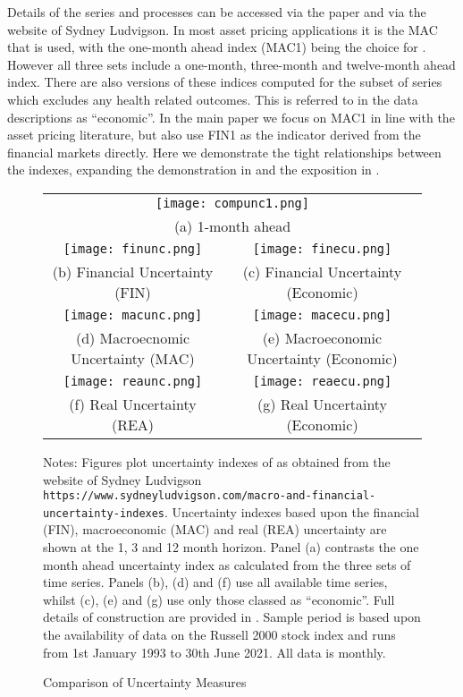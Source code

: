 \documentclass{article}
\begin{document}
Details of the series and processes can be accessed via the paper and via the website of Sydney Ludvigson. In most asset pricing applications it is the MAC that is used, with the one-month ahead index (MAC1) being the choice for \cite{bali2017economic,bali2021macroeconomic}. However all three sets include a one-month, three-month and twelve-month ahead index. There are also versions of these indices computed for the subset of series which excludes any health related outcomes. This is referred to in the data descriptions as ``economic''. In the main paper we focus on MAC1 in line with the asset pricing literature, but also use FIN1 as the indicator derived from the financial markets directly. Here we demonstrate the tight relationships between the indexes, expanding the demonstration in \cite{bali2017economic} and the exposition in \cite{lee2021uncertainty}. 

\begin{figure}
    \begin{center}
        \caption{Comparison of Uncertainty Measures}
        \label{fig:aunc}
        \begin{tabular}{c c}
             \multicolumn{2}{c}{\texttt{[image: compunc1.png]}}  \\
             \multicolumn{2}{c}{(a) 1-month ahead} \\
             \texttt{[image: finunc.png]} &
             \texttt{[image: finecu.png]} \\
             (b) Financial Uncertainty (FIN) & (c) Financial Uncertainty (Economic) \\
             \texttt{[image: macunc.png]} &
             \texttt{[image: macecu.png]} \\
             (d) Macroecnomic Uncertainty (MAC) & (e) Macroeconomic Uncertainty (Economic) \\
             \texttt{[image: reaunc.png]} &
             \texttt{[image: reaecu.png]} \\
             (f) Real Uncertainty (REA) & (g) Real Uncertainty (Economic) \\
        \end{tabular}
    \end{center}
\footnotesize{Notes: Figures plot uncertainty indexes of \cite{jurado2015measuring} as obtained from the website of Sydney Ludvigson \texttt{https://www.sydneyludvigson.com/macro-and-financial-uncertainty-indexes}. Uncertainty indexes based upon the financial (FIN), macroeconomic (MAC) and real (REA) uncertainty are shown at the 1, 3 and 12 month horizon. Panel (a) contrasts the one month ahead uncertainty index as calculated from the three sets of time series. Panels (b), (d) and (f) use all available time series, whilst (c), (e) and (g) use only those classed as ``economic''. Full details of construction are provided in \cite{jurado2015measuring}. Sample period is based upon the availability of data on the Russell 2000 stock index and runs from 1st January 1993 to 30th June 2021. All data is monthly.}
\end{figure}
\end{document}
